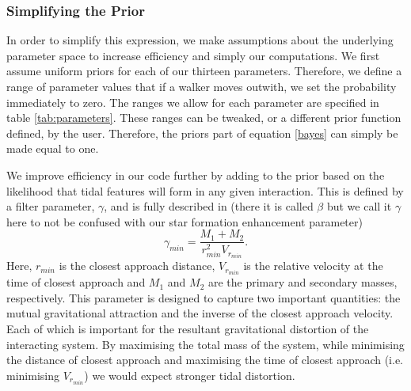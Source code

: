 \subsubsection{Simplifying the Prior}
In order to simplify this expression, we make assumptions about the underlying parameter space to increase efficiency and simply our computations. We first assume uniform priors for each of our thirteen parameters. Therefore, we define a range of parameter values that if a walker moves outwith, we set the probability immediately to zero. The ranges we allow for each parameter are specified in table \ref{tab:parameters}. These ranges can be tweaked, or a different prior function defined, by the user. Therefore, the priors part of equation \ref{bayes} can simply be made equal to one.

We improve efficiency in our code further by adding to the prior based on the likelihood that tidal features will form in any given interaction. This is defined by a filter parameter, $\gamma$, and is fully described in \citet{Holincheck_16} (there it is called $\beta$ but we call it $\gamma$ here to not be confused with our star formation enhancement parameter)
\begin{equation}\label{gamma_param}
    \gamma_{min} = \frac{M_{1} + M_{2}}{r_{min}^{2}V_{r_{min}}}.
\end{equation}
Here, $r_{min}$ is the closest approach distance, $V_{r_{min}}$ is the relative velocity at the time of closest approach and $M_{1}$ and $M_{2}$ are the primary and secondary masses, respectively. This parameter is designed to capture two important quantities: the mutual gravitational attraction and the inverse of the closest approach velocity. Each of which is important for the resultant gravitational distortion of the interacting system. By maximising the total mass of the system, while minimising the distance of closest approach and maximising the time of closest approach (i.e. minimising $V_{r_{min}}$) we would expect stronger tidal distortion. 

